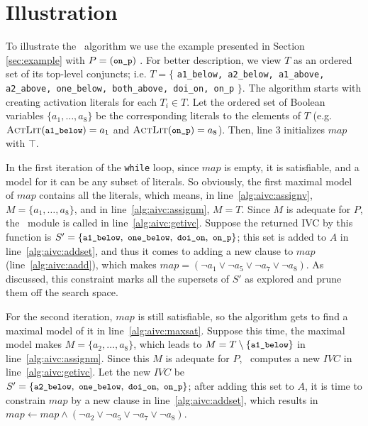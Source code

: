 \section{Illustration}
\label{sec:illust}
To illustrate the \aivcalg ~algorithm we use the example presented in Section \ref{sec:example} with $P = (\small{\texttt{on\_p}})$ .
For better description, we view $T$ as an ordered set of its top-level conjuncts; i.e. $T = \{$ {\small \texttt{a1\_below, a2\_below, a1\_above, a2\_above, one\_below, both\_above, doi\_on, on\_p}} $\}$.
The algorithm starts with creating activation literals for each $T_i \in T$. Let the ordered set of Boolean variables $\{ a_1, \ldots , a_8 \}$ be the corresponding literals to the elements of $T$ (e.g. $\actlit (\small{\texttt{a1\_below}}) = a_1$ and $\actlit (\small{\texttt{on\_p}}) = a_8$). Then, line 3 initializes $map$ with $\top$.

In the first iteration of the \texttt{while} loop, since $map$ is empty,
it is satisfiable, and a model for it can
be any subset of literals. So obviously, the first maximal model of $map$ contains all the literals, which means, in line~\ref{alg:aivc:assignv}, $M = \{a_1, \ldots, a_8\}$,
 and in line~\ref{alg:aivc:assignm}, $M = T$. Since $M$ is adequate for $P$,
 the \getivc ~module is called in line~\ref{alg:aivc:getivc}.
 Suppose the returned IVC by this function  is
 $S' = \{ \small{ \texttt{a1\_below},~\texttt{one\_below}, ~\texttt{doi\_on},~\texttt{on\_p}}\}$;
this set is added to $A$ in line~\ref{alg:aivc:addset}, and thus it comes to adding a new clause to $map$ (line~\ref{alg:aivc:aadd}), which makes $map = (\neg a_1 \vee \neg a_5 \vee \neg a_7 \vee \neg a_8)$.
As discussed, this constraint marks all the supersets of $S'$ as explored and prune them off the search space.

For the second iteration, $map$ is still satisfiable,
so the algorithm gets to find a maximal model of it in line~\ref{alg:aivc:maxsat}. Suppose this time, the maximal model makes $M = \{a_2, \ldots, a_8\}$,
which leads to $M = T \setminus \{\small{\texttt{a1\_below}}\} $ in line~\ref{alg:aivc:assignm}.
Since this $M$ is adequate for $P$, \getivc ~computes a new $IVC$ in line~\ref{alg:aivc:getivc}.
Let the new $IVC$ be $S' = \{ \small{ \texttt{a2\_below},~\texttt{one\_below}, ~\texttt{doi\_on},~\texttt{on\_p}}\}$; after adding this set to $A$,
it is time to constrain $map$ by a new clause in line~\ref{alg:aivc:addset},
which results in $map \leftarrow map \wedge (\neg a_2 \vee \neg a_5 \vee \neg a_7 \vee \neg a_8)$.

